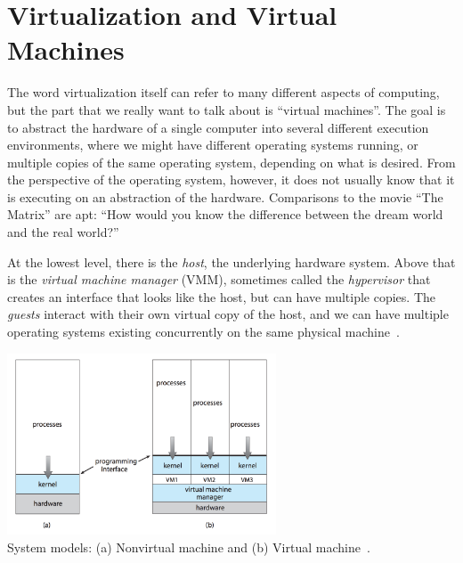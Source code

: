 




\section*{Virtualization and Virtual Machines}

The word virtualization itself can refer to many different aspects of computing, but the part that we really want to talk about is ``virtual machines''. The goal is to abstract the hardware of a single computer into several different execution environments, where we might have different operating systems running, or multiple copies of the same operating system, depending on what is desired. From the perspective of the operating system, however, it does not usually know that it is executing on an abstraction of the hardware. Comparisons to the movie ``The Matrix'' are apt: ``How would you know the difference between the dream world and the real world?''

At the lowest level, there is the \textit{host}, the underlying hardware system. Above that is the \textit{virtual machine manager} (VMM), sometimes called the \textit{hypervisor} that creates an interface that looks like the host, but can have multiple copies. The \textit{guests} interact with their own virtual copy of the host, and we can have multiple operating systems existing concurrently on the same physical machine~\cite{osc}. 

\begin{center}
	\includegraphics[width=0.6\textwidth]{images/non-virtual-machine.png}\\
	System models: (a) Nonvirtual machine and (b) Virtual machine~\cite{osc}.
\end{center}

